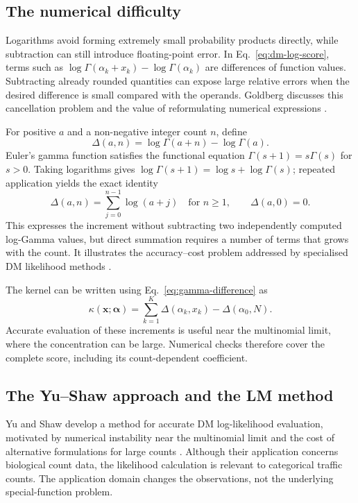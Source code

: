 \subsection{The numerical difficulty}

Logarithms avoid forming extremely small probability products directly,
while subtraction can still introduce floating-point error. In
Eq.~\eqref{eq:dm-log-score}, terms such as
$\log\Gamma(\alpha_k+x_k)-\log\Gamma(\alpha_k)$ are differences of
function values. Subtracting already rounded quantities can expose large
relative errors when the desired difference is small compared with the
operands. Goldberg discusses this cancellation problem and the value of
reformulating numerical expressions \cite{goldberg1991}.

For positive $a$ and a non-negative integer count $n$, define
\begin{equation}
  \Delta(a,n)=\log\Gamma(a+n)-\log\Gamma(a).
\label{eq:gamma-difference}
\end{equation}
Euler's gamma function satisfies the functional equation
$\Gamma(s+1)=s\Gamma(s)$ for $s>0$. Taking logarithms gives
$\log\Gamma(s+1)=\log s+\log\Gamma(s)$; repeated application yields
the exact identity
\[
  \Delta(a,n)=\sum_{j=0}^{n-1}\log(a+j)
  \quad\text{for }n\geq 1,
  \qquad \Delta(a,0)=0.
\]
This expresses the increment without subtracting two independently
computed log-Gamma values, but direct summation requires a number of terms
that grows with the count. It illustrates the accuracy--cost problem
addressed by specialised DM likelihood methods
\cite{yu2014,languasco2023}.

The kernel can be written using Eq.~\eqref{eq:gamma-difference} as
\[
  \kappa(\boldsymbol{x};\boldsymbol{\alpha})
    =\sum_{k=1}^{K}\Delta(\alpha_k,x_k)
      -\Delta(\alpha_0,N).
\]
Accurate evaluation of these increments is useful near the multinomial
limit, where the concentration can be large. Numerical checks therefore
cover the complete score, including its count-dependent coefficient.

\subsection{The Yu--Shaw approach and the LM method}

Yu and Shaw develop a method for accurate DM log-likelihood evaluation,
motivated by numerical instability near the multinomial limit and the
cost of alternative formulations for large counts \cite{yu2014}. Although
their application concerns biological count data, the likelihood
calculation is relevant to categorical traffic counts. The application
domain changes the observations, not the underlying special-function
problem.

